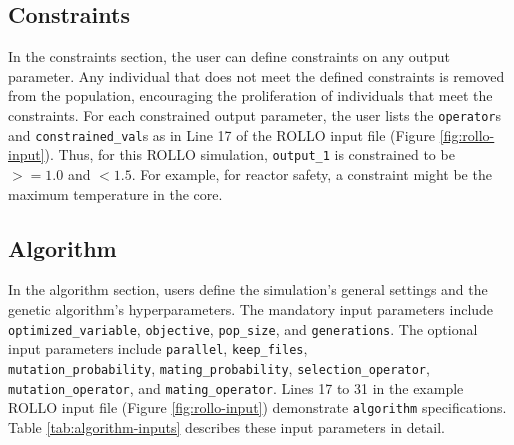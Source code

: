 \subsection{Constraints}
In the constraints section, the user can define constraints on any output parameter. 
Any individual that does not meet the defined constraints is removed from the 
population, encouraging the proliferation of individuals that meet the 
constraints. 
For each constrained output parameter, the user lists the \texttt{operator}s 
and \texttt{constrained\_val}s as in Line 17 of the \gls{ROLLO} input file 
(Figure \ref{fig:rollo-input}). 
Thus, for this \gls{ROLLO} simulation, \texttt{output\_1} is constrained to be 
$>= 1.0$ and $< 1.5$. 
For example, for reactor safety, a constraint might be the maximum temperature in the 
core.

\subsection{Algorithm}
In the algorithm section, users define the simulation's general settings and the
genetic algorithm's hyperparameters. 
The mandatory input parameters include \texttt{optimized\_variable}, \texttt{objective},
\texttt{pop\_size}, and \texttt{generations}.
The optional input parameters include \texttt{parallel}, \texttt{keep\_files}, \\
\texttt{mutation\_probability}, \texttt{mating\_probability}, 
\texttt{selection\_operator}, \texttt{mutation\_operator}, 
and \texttt{mating\_operator}. 
Lines 17 to 31 in the example \gls{ROLLO} input file (Figure \ref{fig:rollo-input}) 
demonstrate \texttt{algorithm} specifications. 
Table \ref{tab:algorithm-inputs} describes these input parameters in detail. 
